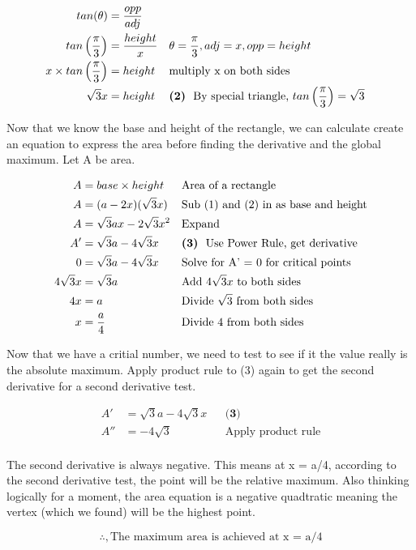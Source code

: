 \documentclass[12pt]{book}
\begin{document}
\begin{enumerate}
\addtolength{\jot}{-0.6em}
\begin{align*}
    tan(\theta) &= \dfrac{opp}{adj} \\
    tan \left( \dfrac{\pi}{3} \right) &= \dfrac{height}{x} && \theta = \dfrac{\pi}{3}, adj = x, opp=height \\
    x \times tan \left( \dfrac{\pi}{3} \right) &= height && \text{multiply x on both sides} \\
    \sqrt3 x&= height && \textbf{(2)} \text{\space \space By special triangle, } tan \left( \dfrac{\pi}{3} \right) = \sqrt3 \\
\end{align*}

\newpage

Now that we know the base and height of the rectangle, we can calculate 
create an equation to express the area before finding the derivative and 
the global maximum. Let A be area.

\addtolength{\jot}{-0.6em}
\begin{align*}
    A &= base \times height && \text{Area of a rectangle}\\
    A &= (a - 2x)(\sqrt3x) && \text{Sub (1) and (2) in as base and height} \\
    A &= \sqrt3ax-2\sqrt3x^2 && \text{Expand} \\
    A' &=  \sqrt3a-4\sqrt3x && \textbf{(3)} \text{\space \space Use Power Rule, get derivative} \\
    0 &=  \sqrt3a-4\sqrt3x && \text{Solve for A' = 0 for critical points}\\
    4\sqrt3x &=  \sqrt3a && \text{Add } 4\sqrt3x \text{ to both sides} \\
    4x &=  a && \text{Divide } \sqrt3 \text{ from both sides} \\
    x &= \dfrac{a}{4} && \text{Divide } 4 \text{ from both sides} \\  
\end{align*}

Now that we have a critial number, we need to test to see 
if it the value really is the absolute maximum. Apply product rule 
to (3) again to get the second derivative for a second derivative test.

\addtolength{\jot}{-0.6em}
\begin{align*}
    A' &=  \sqrt3a-4\sqrt3x && \textbf{(3)} \\
    A'' &=  -4\sqrt3 && \text{Apply product rule}\\
\end{align*}

The second derivative is always negative. This means at x = a/4, 
according to the second derivative test, the point will be the 
relative maximum. Also thinking logically for a moment, the area 
equation is a negative quadtratic meaning the vertex (which we 
found) will be the highest point.

\vspace{0.5cm}
$$\boxed{\therefore, \text{The maximum area is achieved at x = a/4}}$$


\newpage



\end{enumerate}
\end{document}
